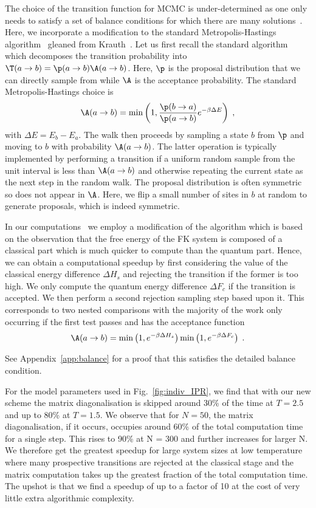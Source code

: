 The choice of the transition function for \ac{MCMC} is under-determined as one only needs to satisfy a set of balance conditions for which there are many solutions~\cite{kellyReversibilityStochasticNetworks1981}. Here, we incorporate a modification to the standard Metropolis-Hastings algorithm~\cite{hastingsMonteCarloSampling1970} gleaned from Krauth~\cite{krauthIntroductionMonteCarlo1998}. Let us first recall the standard algorithm which decomposes the transition probability into \(\T(a \to b) = \p(a \to b)\A(a \to b)\). Here,  \(\p\) is the proposal distribution that we can directly sample from while \(\A\) is the acceptance probability. The standard Metropolis-Hastings choice is 
\[\A(a \to b) = \min\left(1, \frac{\p(b\to a)}{\p(a\to b)} e^{-\beta \Delta E}\right)\;,\]
with \(\Delta E = E_b - E_a\). The walk then proceeds by sampling a state \(b\) from \(\p\) and moving to \(b\) with probability \(\A(a \to b)\). The latter operation is typically implemented by performing a transition if a uniform random sample from the unit interval is less than \(\A(a \to b)\) and otherwise repeating the current state as the next step in the random walk. The proposal distribution is often symmetric so does not appear in \(\A\). Here, we flip a small number of sites in \(b\) at random to generate proposals, which is indeed symmetric. 

In our computations~\cite{hodsonMCMCFKModel2021} we employ a modification of the algorithm which is based on the observation that the free energy of the \ac{FK} system is composed of a classical part which is much quicker to compute than the quantum part. Hence, we can obtain a computational speedup by first considering the value of the classical energy difference \(\Delta H_s\) and rejecting the transition if the former is too high. We only compute the quantum energy difference \(\Delta F_c\) if the transition is accepted. We then 
perform a second rejection sampling step based upon it. This corresponds to two nested comparisons with the majority of the work only occurring if the first test passes and has the acceptance function 
\[\A(a \to b) = \min\left(1, e^{-\beta \Delta H_s}\right)\min\left(1, e^{-\beta \Delta F_c}\right)\;.\]

See Appendix~\ref{app:balance} for a proof that this satisfies the detailed balance condition.

For the model parameters used in Fig.~\ref{fig:indiv_IPR}, we find that with our new scheme the matrix diagonalisation is skipped around 30\% of the time at \(T = 2.5\) and up to 80\% at \(T = 1.5\). We observe that for  \(N = 50\), the matrix diagonalisation, if it occurs, occupies around 60\% of the total computation time for a single step. This rises to 90\% at N = 300 and further increases for larger N. We therefore get the greatest speedup for large system sizes at low temperature where many prospective transitions are rejected at the classical stage and the matrix computation takes up the greatest fraction of the total computation time. The upshot is that we find a  speedup of up to a factor of 10 at the cost of very little extra algorithmic complexity. 


